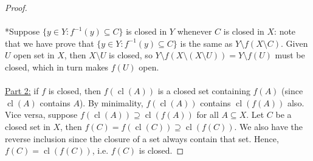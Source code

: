 \documentclass{treatise}
\begin{document}
\begin{proof}
\\
\\
*Suppose $\{ y \in Y : f^{-1}(y) \subseteq C \}$ is closed in $Y$ whenever $C$ is closed in $X$: note that we have prove that $\{ y \in Y : f^{-1}(y) \subseteq C \}$ is the same as $Y \setminus f(X \setminus C)$. Given $U$ open set in $X$, then $X \setminus U$ is closed, so $Y \setminus f(X \setminus (X \setminus U)) = Y \setminus f(U)$ must be closed, which in turn makes $f(U)$ open.
\\
\\
\underline{Part 2:} if $f$ is closed, then $f(\operatorname{cl}(A))$ is a closed set containing $f(A)$ (since $\operatorname{cl}(A)$ contains $A$). By minimality, $f(\operatorname{cl}(A))$ contains $\operatorname{cl}(f(A))$ also. Vice versa, suppose $f(\operatorname{cl}(A)) \supseteq \operatorname{cl}(f(A))$ for all $A \subseteq X$. Let $C$ be a closed set in $X$, then $f(C) = f(\operatorname{cl}(C)) \supseteq \operatorname{cl}(f(C))$. We also have the reverse inclusion since the closure of a set always contain that set. Hence,  $f(C) = \operatorname{cl}(f(C))$, i.e. $f(C)$ is closed.
\end{proof}
\end{document}
